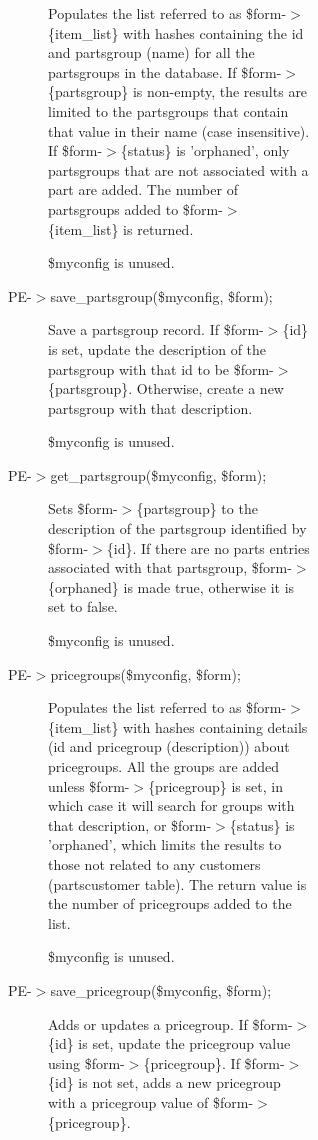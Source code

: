 \begin{description}
\begin{description}
\begin{description}
\begin{description}
\begin{description}
\begin{description}
Populates the list referred to as \$form-$>$\{item\_list\} with hashes containing
the id and partsgroup (name) for all the partsgroups in the database.  If
\$form-$>$\{partsgroup\} is non-empty, the results are limited to the partsgroups
that contain that value in their name (case insensitive).  If \$form-$>$\{status\}
is 'orphaned', only partsgroups that are not associated with a part are added.
The number of partsgroups added to \$form-$>$\{item\_list\} is returned.



\$myconfig is unused.


\item[{PE-$>$save\_partsgroup(\$myconfig, \$form);}] \mbox{}

Save a partsgroup record.  If \$form-$>$\{id\} is set, update the description of
the partsgroup with that id to be \$form-$>$\{partsgroup\}.  Otherwise, create a
new partsgroup with that description.



\$myconfig is unused.


\item[{PE-$>$get\_partsgroup(\$myconfig, \$form);}] \mbox{}

Sets \$form-$>$\{partsgroup\} to the description of the partsgroup identified by
\$form-$>$\{id\}.  If there are no parts entries associated with that partsgroup,
\$form-$>$\{orphaned\} is made true, otherwise it is set to false.



\$myconfig is unused.


\item[{PE-$>$pricegroups(\$myconfig, \$form);}] \mbox{}

Populates the list referred to as \$form-$>$\{item\_list\} with hashes containing
details (id and pricegroup (description)) about pricegroups.  All the groups
are added unless \$form-$>$\{pricegroup\} is set, in which case it will search for
groups with that description, or \$form-$>$\{status\} is 'orphaned', which limits
the results to those not related to any customers (partscustomer table).  The
return value is the number of pricegroups added to the list.



\$myconfig is unused.


\item[{PE-$>$save\_pricegroup(\$myconfig, \$form);}] \mbox{}

Adds or updates a pricegroup.  If \$form-$>$\{id\} is set, update the pricegroup
value using \$form-$>$\{pricegroup\}.  If \$form-$>$\{id\} is not set, adds a new
pricegroup with a pricegroup value of \$form-$>$\{pricegroup\}.




\end{description}
\end{description}
\end{description}
\end{description}
\end{description}
\end{description}
